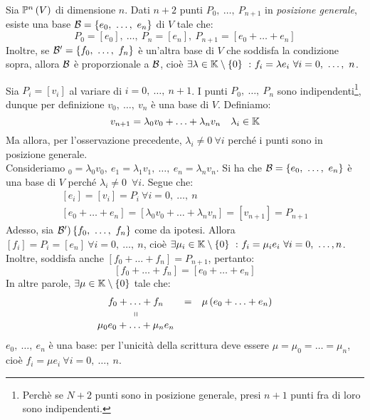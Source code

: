 \begin{theorema}
	Sia $\proj{V}$ di dimensione $n$. Dati $n+2$ punti $P_0,\ \ldots,\ P_{n+1}$ in \textit{posizione generale}, esiste una base $\basis=\left\{e_0,\ \ldots,\ e_n\right\}$ di $V$ tale che:
	\begin{equation}
		P_0=\left[e_0\right],\ \ldots,\ P_n=\left[e_n\right],\ P_{n+1}=\left[e_0+\ldots+e_n\right]
	\end{equation}
Inoltre, se $\basis'=\left\{f_0,\ \ldots,\ f_n\right\}$ è un'altra base di $V$ che soddisfa la condizione sopra, allora $\mathcal{B}$ è proporzionale a $\mathcal{B}$, cioè $\exists\lambda\in\kamp\setminus\left\{0\right\}\ \colon f_i=\lambda e_i\ \forall i=0,\ \ldots,\ n$.
\end{theorema}
\begin{demonstration}
	Sia $P_i=\left[v_i\right]$ al variare di $i=0,\ \ldots,\ n+1$. I punti $P_0,\ \ldots,\ P_n$ sono indipendenti\footnote{Perchè se $N+2$ punti sono in posizione generale, presi $n+1$ punti fra di loro sono indipendenti.}, dunque per definizione $v_0,\ \ldots,\ v_n$ è una base di $V$. Definiamo:
	\begin{equation*}
		v_{n+1}=\lambda_0v_0+\ldots+\lambda_nv_n\quad \lambda_i\in\mathbb{K}
	\end{equation*}
	Ma allora, per l'osservazione precedente, $\lambda_i\neq 0\ \forall i$ perché i punti sono in posizione generale.\\
	Consideriamo $_0=\lambda_0v_0,\ e_1=\lambda_1v_1,\ \ldots,\ e_n=\lambda_nv_n$. Si ha che $\basis=\left\{e_0,\ \ldots,\ e_n\right\}$ è una base di $V$ perché $\lambda_i\neq 0$\ $\forall i$. Segue che:
	\begin{gather*}
		\left[e_i\right]=\left[v_i\right]=P_i\ \forall i=0,\ \ldots,\ n\\
		\left[e_0+\ldots+e_n\right]=\left[\lambda_0v_0+\ldots+\lambda_nv_n\right]=\left[v_{n+1}\right]=P_{n+1}
	\end{gather*}
Adesso, sia $\mathcal{B}')\left\{f_0,\ \ldots,\ f_n\right\}$ come da ipotesi. Allora $\left[f_i\right]=P_i=\left[e_n\right]\ \forall i=0,\ \ldots,\ n$, cioè $\exists \mu_i\in\mathbb{K}\setminus\left\{0\right\}\ \colon f_i=\mu_i e_i\ \forall i=0,\ \ldots, n$. Inoltre, soddisfa anche $\left[f_0+\ldots+f_n\right]=P_{n+1}$, pertanto:
\begin{equation*}
	\left[f_0+\ldots+f_n\right]=\left[e_0+\ldots+e_n\right]
\end{equation*}
In altre parole, $\exists \mu\in\mathbb{K}\setminus\left\{0\right\}$ tale che:
\begin{equation*}
	\begin{array}{ccc}
		f_0+\ldots+f_n&=&\mu\left(e_0+\ldots+e_n\right)\\
		\shortparallel&&\\
		\mu_0e_0+\ldots+\mu_ne_n&&
	\end{array}
\end{equation*}
$e_0,\ \ldots,\ e_n$ è una base: per l'unicità della scrittura deve essere $\mu=\mu_0=\ldots=\mu_n$, cioè $f_i=\mu e_i\ \forall i=0,\ \ldots,\ n$.
\end{demonstration}
